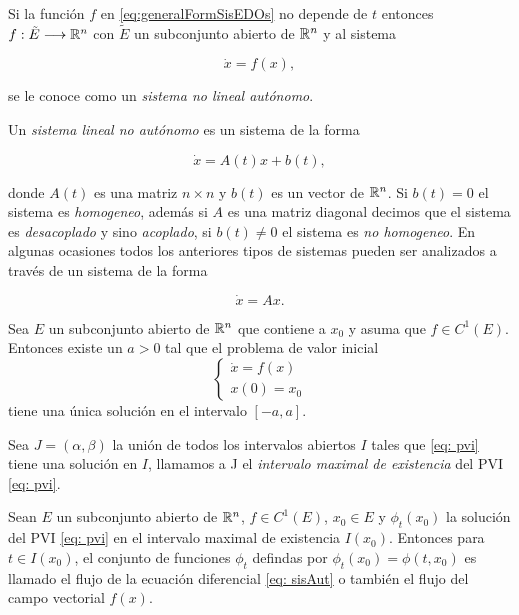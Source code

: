 Si la función $f$ en \eqref{eq:generalFormSisEDOs} no depende de $t$ entonces $f:\tilde{E} \longrightarrow {\mathbb{R}}^{n}$ con $\tilde{E}$ un subconjunto abierto de ${\mathbb{R}}^{n}$ y al sistema 

\begin{equation}
	\dot{x} = f(x),
	\label{eq: sisAut}
\end{equation} 

se le conoce como un \textit{sistema no lineal autónomo}.

Un \textit{sistema lineal no autónomo} es un sistema de la forma

\begin{equation*}
	\dot{x} = A(t)x + b(t),
	\label{eq: sistemaLineal}
\end{equation*}

donde $A(t)$ es una matriz $n \times n$ y $b(t)$ es un vector de ${\mathbb{R}}^{n}$. Si $b(t) = 0$ el sistema es \textit{homogeneo}, además si $A$ es una matriz diagonal decimos que el sistema es \textit{desacoplado} y sino \textit{acoplado}, si $b(t) \neq 0$ el sistema es \textit{no homogeneo}. En algunas ocasiones todos los anteriores tipos de sistemas pueden ser analizados a través de un sistema de la forma

\begin{equation}
	\dot{x} = Ax.
	\label{eq: sisLinAuto}
\end{equation}

\begin{teo}\label{teo: Existencia y unicidad}
	Sea $E$ un subconjunto abierto de ${\mathbb{R}}^{n}$ que contiene a $x_{0}$ y asuma que $f \in C^{1}(E)$. Entonces existe un $a>0$ tal que el problema de valor inicial 
	\begin{equation}
		\left\{
		\begin{aligned}
			\dot{x} = f(x) \\
			x(0) = x_{0}
		\end{aligned}
		\right.
		\label{eq: pvi}
	\end{equation}
	tiene una única solución en el intervalo $[-a,a]$.
\end{teo}

Sea $J=(\alpha, \beta)$ la unión de todos los intervalos abiertos $I$ tales que \eqref{eq: pvi} tiene una solución en $I$, llamamos a J el \textit{intervalo maximal de existencia} del PVI \eqref{eq: pvi}.

\begin{defi}
	Sean $E$ un subconjunto abierto de ${\mathbb{R}}^{n}$, $f \in C^{1}(E)$, $x_{0} \in E$ y $\phi_{t}(x_{0})$ la solución del PVI \eqref{eq: pvi} en el intervalo maximal de existencia $I(x_{0})$. Entonces para $t\in I(x_{0})$, el conjunto de funciones $\phi_{t}$ defindas por $\phi_{t}(x_{0}) = \phi(t, x_{0})$ es llamado el flujo de la ecuación diferencial \eqref{eq: sisAut} o también el flujo del campo vectorial $f(x)$.
\end{defi}

